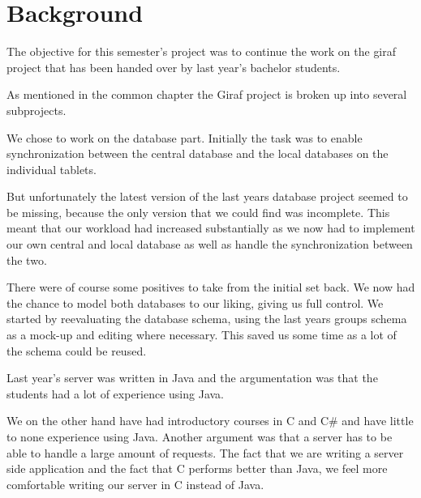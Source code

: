 \section{Background}
The objective for this semester's project was to continue the work on the \ac{giraf} project that has been handed over by last year's bachelor students. 

As mentioned in the common chapter the Giraf project is broken up into several subprojects. 

We chose to work on the database part. Initially the task was to enable synchronization between the central database and the local databases on the individual tablets.

But unfortunately the latest version of the last years database project seemed to be missing, because the only version that we could find was incomplete. This meant that our workload had increased substantially as we now had to implement our own central and local database as well as handle the synchronization between the two.

There were of course some positives to take from the initial set back. We now had the chance to model both databases to our liking, giving us full control. We started by reevaluating the database schema, using the last years groups schema as a mock-up and editing where necessary. This saved us some time as a lot of the schema could be reused.

Last year's server was written in Java and the argumentation was that the students had a lot of experience using Java.

We on the other hand have had introductory courses in C and C\# and have little to none experience using Java. Another argument was that a server has to be able to handle a large amount of requests. The fact that we are writing a server side application and the fact that C performs better than Java, we feel more comfortable writing our server in C instead of Java.
